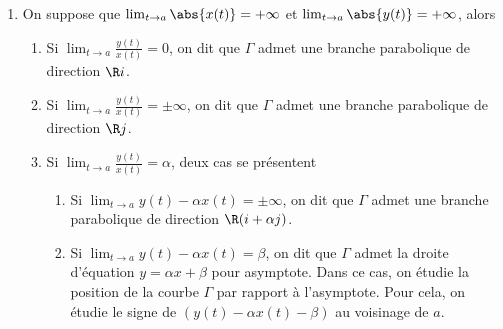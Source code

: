 \begin{enumerate}
	\item On suppose que $\lim_{t\to a} \abs{x(t)} = +\infty$ et  $\lim_{t\to a} \abs{y(t)} = +\infty$, alors 
		\begin{enumerate}
			\item Si $\lim_{t\to a} \frac{y(t)}{x(t)} = 0$, on dit que $\Gamma$ admet une branche parabolique de direction $\R i$.
		\begin{center}
		\end{center}
			\item Si $\lim_{t\to a} \frac{y(t)}{x(t)} = \pm \infty$, on dit que $\Gamma$ admet une branche parabolique de direction $\R j$.\sld{\vfill\pagebreak[5]}%

			\item Si $\lim_{t\to a} \frac{y(t)}{x(t)} = \alpha$, deux cas se présentent
				\begin{enumerate}
					\item  Si $\lim_{t\to a} y(t) - \alpha x(t) =  \pm \infty$, on dit que $\Gamma$ admet une branche parabolique de direction $\R (i + \alpha j)$.
                                        \item  Si $\lim_{t\to a} y(t) - \alpha x(t) =  \beta$, on dit que $\Gamma$ admet la droite d'équation $y = \alpha x + \beta$ pour asymptote. Dans ce cas, on étudie la position de la courbe $\Gamma$ par rapport à l'asymptote. Pour cela, on étudie le signe de  $(y(t) - \alpha x(t) - \beta)$ au voisinage de $a$.
	\begin{center}
		\end{center}
				\end{enumerate}
		\end{enumerate}
\end{enumerate}

